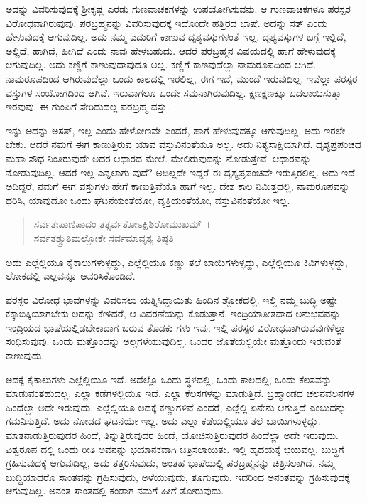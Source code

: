 ಅದನ್ನು ವಿವರಿಸುವುದಕ್ಕೆ ಶ‍್ರೀಕೃಷ್ಣ ಎರಡು ಗುಣವಾಚಕಗಳನ್ನು ಉಪಯೋಗಿಸುವನು. ಆ ಗುಣವಾಚಕಗಳೂ ಪರಸ್ಪರ ವಿರೋಧವಾಗಿರುವುವು. ಪರಬ್ರಹ್ಮನನ್ನು ವಿವರಿಸುವುದಕ್ಕೆ ಇದೊಂದೇ ಹತ್ತಿರದ ಭಾಷೆ. ಅದನ್ನು ಸತ್ ಎಂದು ಹೇಳುವುದಕ್ಕೆ ಆಗುವುದಿಲ್ಲ. ಅದು ನಮ್ಮ ಎದುರಿಗೆ ಕಾಣುವ ದೃಶ್ಯವಸ್ತುಗಳಂತೆ ಇಲ್ಲ. ದೃಶ್ಯವಸ್ತುಗಳ ಬಗ್ಗೆ ಇಲ್ಲಿದೆ, ಅಲ್ಲಿದೆ, ಹಾಗಿದೆ, ಹೀಗಿದೆ ಎಂದು ನಾವು ಹೇಳಬಹುದು. ಆದರೆ ಪರಬ್ರಹ್ಮನ ವಿಷಯದಲ್ಲಿ ಹಾಗೆ ಹೇಳುವುದಕ್ಕೆ ಆಗುವುದಿಲ್ಲ. ಅದು ಕಣ್ಣಿಗೆ ಕಾಣುವುದಾವುದೂ ಅಲ್ಲ. ಕಣ್ಣಿಗೆ ಕಾಣವುದೆಲ್ಲಾ ನಾಮರೂಪದಿಂದ ಆಗಿದೆ. ನಾಮರೂಪದಿಂದ ಆಗಿರುವುದೆಲ್ಲಾ ಒಂದು ಕಾಲದಲ್ಲಿ ಇರಲಿಲ್ಲ, ಈಗ ಇದೆ, ಮುಂದೆ ಇರುವುದಿಲ್ಲ. ಇವೆಲ್ಲಾ ಪರಸ್ಪರ ವಸ್ತುಗಳ ಸಂಯೋಗದಿಂದ ಆಗಿವೆ. ಇರುವಾಗಲೂ ಒಂದೇ ಸಮನಾಗಿರುವುದಿಲ್ಲ. ಕ್ಷಣಕ್ಷಣಕ್ಕೂ ಬದಲಾಯಿಸುತ್ತಾ ಇರವುವು. ಈ ಗುಂಪಿಗೆ ಸೇರಿದುದಲ್ಲ ಪರಬ್ರಹ್ಮ ವಸ್ತು.

ಇನ್ನು ಅದನ್ನು ಅಸತ್, ಇಲ್ಲ ಎಂದು ಹೇಳೋಣವೇ ಎಂದರೆ, ಹಾಗೆ ಹೇಳುವುದಕ್ಕೂ ಆಗುವುದಿಲ್ಲ. ಅದು ಇರಲೇ ಬೇಕು. ಆದರೆ ನಮಗೆ ಈಗ ಕಾಣುತ್ತಿರುವ ಯಾವ ವಸ್ತುವಿನಂತೆಯೂ ಅಲ್ಲ. ಅದು ನಿತ್ಯಸಾಕ್ಷಿಯಾಗಿದೆ. ದೃಶ್ಯಪ್ರಪಂಚದ ಮಹಾ ಸೌಧ ನಿಂತಿರುವುದೇ ಅದರ ಆಧಾರದ ಮೇಲೆ. ಮೇಲಿರುವುದನ್ನು ನೋಡುತ್ತೇವೆ. ಆಧಾರವನ್ನು ನೋಡುವುದಿಲ್ಲ. ಆದರೆ ಇಲ್ಲ ಎನ್ನಲಾಗು ವುದೆ? ಅದಿಲ್ಲದೇ ಇದ್ದರೆ ಈ ದೃಶ್ಯಪ್ರಪಂಚವೇ ಇರುತ್ತಿರಲಿಲ್ಲ. ಅದು ಇದೆ. ಅದಿದ್ದರೆ, ನಮಗೆ ಈಗ ವಸ್ತುಗಳು ಹೇಗೆ ಕಾಣುತ್ತಿವೆಯೊ ಹಾಗೆ ಇಲ್ಲ. ದೇಶ ಕಾಲ ನಿಮಿತ್ತದಲ್ಲಿ, ನಾಮರೂಪವನ್ನು ಧರಿಸಿ, ಯಾವುದೋ ಒಂದು ಘಟನೆಯಂತೆಯೋ, ವ್ಯಕ್ತಿಯಂತೆಯೋ, ವಸ್ತುವಿನಂತೆಯೋ ಇಲ್ಲ.

\begin{verse}
ಸರ್ವತಃಪಾಣಿಪಾದಂ ತತ್ಸರ್ವತೋಽಕ್ಷಿಶಿರೋಮುಖಮ್~।\\ಸರ್ವತಶ್ಶ್ರುತಿಮಲ್ಲೋಕೇ ಸರ್ವಮಾವೃತ್ಯ ತಿಷ್ಠತಿ 
\end{verse}

{\small ಅದು ಎಲ್ಲೆಲ್ಲಿಯೂ ಕೈಕಾಲುಗಳುಳ್ಳದ್ದು, ಎಲ್ಲೆಲ್ಲಿಯೂ ಕಣ್ಣು ತಲೆ ಬಾಯಿಗಳುಳ್ಳದ್ದು, ಎಲ್ಲೆಲ್ಲಿಯೂ ಕಿವಿಗಳುಳ್ಳದ್ಧು, ಲೋಕದಲ್ಲಿ ಎಲ್ಲವನ್ನೂ ಆವರಿಸಿಕೊಂಡಿದೆ.}

ಪರಸ್ಪರ ವಿರೋಧ ಭಾವಗಳನ್ನು ವಿವರಿಸಲು ಯತ್ನಿಸಿದ್ದಾಯಿತು ಹಿಂದಿನ ಶ್ಲೋಕದಲ್ಲಿ. ಇಲ್ಲಿ ನಮ್ಮ ಬುದ್ಧಿ ಅಷ್ಟೇ ಕಕ್ಕಾಬಿಕ್ಕಿಯಾಗಬೇಕು ಅದನ್ನು ಕೇಳಿದರೆ, ಆ ವಿವರಣೆಯನ್ನು ಕೊಡುತ್ತಾನೆ. ಇಂದ್ರಿಯಾತೀತವಾದ ಅನುಭವವನ್ನು ಇಂದ್ರಿಯದ ಭಾಷೆಯಲ್ಲಿಡಬೇಕಾದಾಗ ಬರುವ ತೊಡಕು ಗಳು ಇವು. ಇಲ್ಲಿ ಪರಸ್ಪರ ವಿರೋಧವಾಗಿರುವವುಗಳೆಲ್ಲಾ ಸಂಧಿಸುವುವು. ಒಂದು ಮತ್ತೊಂದನ್ನು ಅಲ್ಲಗಳೆಯುವುದಿಲ್ಲ. ಒಂದರ ಜೊತೆಯಲ್ಲಿಯೇ ಮತ್ತೊಂದು ಇರುವಂತೆ ಕಾಣುವುದು.

ಅದಕ್ಕೆ ಕೈಕಾಲುಗಳು ಎಲ್ಲೆಲ್ಲಿಯೂ ಇದೆ. ಅದೆಲ್ಲೊ ಒಂದು ಸ್ಥಳದಲ್ಲಿ, ಒಂದು ಕಾಲದಲ್ಲಿ, ಒಂದು ಕೆಲಸವನ್ನು ಮಾಡುವಂತಹುದಲ್ಲ. ಎಲ್ಲಾ ಕಡೆಗಳಲ್ಲಿಯೂ ಇದೆ. ಎಲ್ಲಾ ಕೆಲಸಗಳನ್ನು ಮಾಡುತ್ತಿದೆ. ಬ್ರಹ್ಮಾಂಡದ ಚಲನವಲನಗಳ ಹಿಂದೆಲ್ಲಾ ಅದೇ ಇರುವುದು. ಎಲ್ಲೆಲ್ಲಿಯೂ ಅದಕ್ಕೆ ಕಣ್ಣುಗಳಿವೆ ಎಂದರೆ, ಎಲ್ಲೆಲ್ಲಿ ಏನೇನು ಆಗುತ್ತಿದೆ ಎಂಬುದನ್ನು ಗಮನಿಸುತ್ತಿದೆ. ಅದು ನೋಡದ ಘಟನೆಯೇ ಇಲ್ಲ. ಅದು ಎಲ್ಲಾ ಕಡೆಯಲ್ಲಿಯೂ ತಲೆ ಬಾಯಿಗಳುಳ್ಳದ್ದು. ಮಾತನಾಡುತ್ತಿರುವುದರ ಹಿಂದೆ, ತಿನ್ನುತ್ತಿರುವುದರ ಹಿಂದೆ, ಯೋಚಿಸುತ್ತಿರುವುದರ ಹಿಂದೆಲ್ಲಾ ಅದೇ ಇರುವುದು. ವಿಶ್ವರೂಪ ದಲ್ಲಿ ಒಂದು ರೀತಿ ಅವನನ್ನು ಭಯಾನಕವಾಗಿ ಚಿತ್ರಿಸಲಾಯಿತು. ಇಲ್ಲಿ ಹೃದಯಕ್ಕೆ ಭಯವಲ್ಲ, ಬುದ್ಧಿಗೆ ಗ್ರಹಿಸುವುದಕ್ಕೆ ಆಗುವುದಿಲ್ಲ, ಅದು ತತ್ತರಿಸುವುದು, ಅಂತಹ ಭಾಷೆಯಲ್ಲಿ ಪರಬ್ರಹ್ಮನನ್ನು ಚಿತ್ರಿಸಲಾಗಿದೆ. ನಮ್ಮ ಬುದ್ಧಿಯಾದರೊ ಸಾಂತವನ್ನು ಗ್ರಹಿಸುವುದು, ಅಳೆಯುವುದು, ತೂಗುವುದು. ಇದರಿಂದ ಅನಂತವನ್ನು ಗ್ರಹಿಸುವುದಕ್ಕೆ ಆಗುವುದಿಲ್ಲ. ಅನಂತ ಸಾಂತದಲ್ಲಿ ಕಂಡಾಗ ನಮಗೆ ಹೀಗೆ ತೋರುವುದು.

